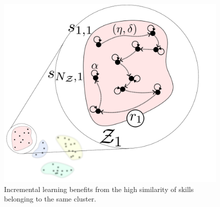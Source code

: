 \begin{figure}[!t]
	\centering
	\includegraphics[width=0.9\columnwidth]{fig/intra_skill_learning.pdf}
	\caption{Incremental learning benefits from the high similarity of skills belonging to the same cluster.}
	\label{fig:intra_skill_learning}
\end{figure}

